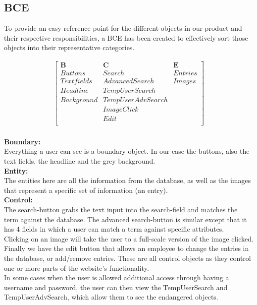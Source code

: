 \documentclass[12pt,a4paper]{article}
\begin{document}
\subsection{BCE}

To provide an easy reference-point for the different objects in our product and their respective responsibilities, a BCE has been created to effectively sort those objects into their representative categories.

\begin{gather*}
\begin{bmatrix}
\textbf{B}&\textbf{C}&\textbf{E}\\
Buttons&Search&Entries\\
Textfields&Advanced Search&Images\\
Headline&TempUserSearch\\
Background&TempUserAdvSearch\\
 &ImageClick\\
 &Edit\\
\end{bmatrix}
\end{gather*}\\
\textbf{Boundary:}\\

Everything a user can see is a boundary object. In our case the buttons, also the text fields, the headline and the grey background.\\


\textbf{Entity:}\\

The entities here are all the information from the database, as well as the images that represent a specific set of information (an entry).\\

\textbf{Control:}\\

The search-button grabs the text input into the search-field and matches the term against the database.
The advanced search-button is similar except that it has 4 fields in which a user can match a term against specific attributes. \\
Clicking on an image will take the user to a full-scale version of the image clicked.\\
Finally we have the edit button that allows an employee to change the entries in the database, or add/remove entries.
These are all control objects as they control one or more parts of the website's functionality.\\
In some cases when the user is allowed additional access through having a username and password, the user can then view the TempUserSearch and TempUserAdvSearch, which allow them to see the endangered objects.
\end{document}

